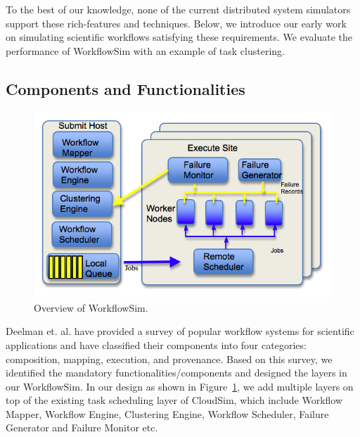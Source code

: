 To the best of our knowledge, none of the current distributed system simulators support these rich-features and techniques. Below, we introduce our early work on simulating scientific workflows satisfying these requirements. We evaluate the performance of WorkflowSim with an example of task clustering. 

\subsection{Components and Functionalities}

\begin{figure}[!htb]
	\centering
	\includegraphics[width=0.6\linewidth]{figures/workflowsim/wfs_overview.png}
	\caption{Overview of WorkflowSim.}
	\label{fig:model_wfs}
\end{figure}

Deelman et. al. \cite{Deelman2009} have provided a survey of popular workflow systems for scientific applications and have classified their components into four categories: composition, mapping, execution, and provenance. Based on this survey, we identified the mandatory functionalities/components and designed the layers in our WorkflowSim. In our design as shown in Figure~\ref{fig:model_wfs}, we add multiple layers on top of the existing task scheduling layer of CloudSim, which include Workflow Mapper, Workflow Engine, Clustering Engine, Workflow Scheduler, Failure Generator and Failure Monitor etc. 

